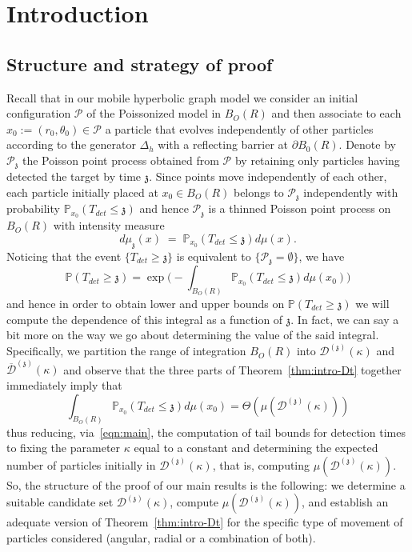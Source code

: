 \documentclass[12pt]{article}
\renewcommand{\P}{\mathbb{P}}
\renewcommand{\ss}{\mathfrak{z}}
\newcommand{\dt}{\mathcal{D}^{(\ss)}}
\newcommand{\ndt}{\overline{\mathcal{D}}^{(\ss)}}
\begin{document}
\section{Introduction}\label{intro}
%


\subsection{Structure and strategy of proof}\label{sec:strategy}
%
Recall that in our mobile hyperbolic graph model
we consider an initial configuration $\mathcal{P}$ of the Poissonized model in $B_O(R)$ and then associate to each $x_0:=(r_0,\theta_0)\in\mathcal{P}$ a particle that evolves independently of other particles according to the generator $\Delta_h$ with a reflecting barrier at $\partial B_0(R)$.
Denote by $\mathcal{P}_{\ss}$ the Poisson point process obtained from $\mathcal{P}$ by retaining only particles having detected the target by time $\ss$.
Since points move independently of each other, each particle initially placed at $x_0\in B_O(R)$ belongs to $\mathcal{P}_{\ss}$ independently with probability $\P_{x_0}(T_{det}\leq \ss)$ and hence $\mathcal{P}_{\ss}$ is a thinned Poisson point process on $B_O(R)$ with intensity measure
\[d\mu_{\ss}(x)\;=\;\P_{x_0}(T_{det}\leq \ss)d\mu(x).\]
Noticing that the event $\{T_{det}\geq \ss\}$ is equivalent to $\{\mathcal{P}_{\ss}=\emptyset\}$, we have
\begin{equation}\label{eqn:main}
    \P(T_{det}\geq \ss)=\exp\Big(-\int_{B_O(R)}\P_{x_0}(T_{det}\leq \ss)d\mu(x_0)\Big)
\end{equation}
and hence in order to obtain lower and upper bounds on $\P(T_{det}\geq \ss)$ we will compute the dependence of this integral as a function of $\ss$.
In fact, we can say a bit more on the way we go about determining the value of the said integral. Specifically, we partition the range of integration $B_O(R)$ into $\dt(\kappa)$ and 
$\ndt(\kappa)$ and observe that the three parts of Theorem~\ref{thm:intro-Dt} together immediately imply that
\[
\int_{B_O(R)}\P_{x_0}(T_{det}\leq \ss)d\mu(x_0) = \Theta(\mu(\dt(\kappa)))
\]
thus reducing, via~\eqref{eqn:main}, the computation of tail bounds for detection times to fixing the parameter $\kappa$ equal to a constant and determining the expected number of particles initially in $\dt(\kappa)$, that is, computing $\mu(\dt(\kappa))$. 
So, the structure of the proof of our main results is the following: we determine a suitable candidate set $\dt(\kappa)$, compute $\mu(\dt(\kappa))$, and establish an adequate version of Theorem~\ref{thm:intro-Dt} for the specific type of movement of particles considered (angular, radial or a combination of both).
\end{document}
